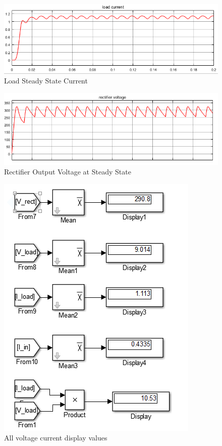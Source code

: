 \documentclass[12pt]{article}
\begin{document}
\begin{figure}[H]
    \centering
    \includegraphics[width=15 cm]{LoadCurrent}
    \caption{Load Steady State Current}
    \label{fig:loadcurrent}
\end{figure}

\begin{figure}[H]
    \centering
    \includegraphics[width=15 cm]{RectifieVoltage}
    \caption{Rectifier Output Voltage at Steady State}
    \label{fig:rectifier}
\end{figure}

\begin{figure}[H]
    \centering
    \includegraphics[width=8 cm]{VIvalues}
    \caption{All voltage current display values}
    \label{fig:display}
\end{figure}
\end{document}
